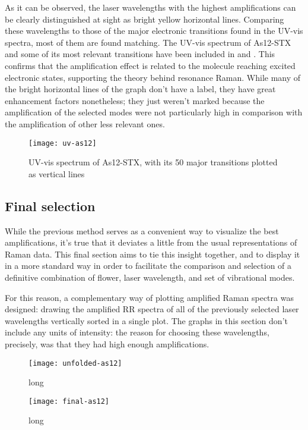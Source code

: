 As it can be observed, the laser wavelengths with the highest amplifications can be clearly distinguished at sight as bright yellow horizontal lines.
Comparing these wavelengths to those of the major electronic transitions found in the UV-vis spectra, most of them are found matching.
The UV-vis spectrum of As12-STX and some of its most relevant transitions have been included in  and .
This confirms that the amplification effect is related to the molecule reaching excited electronic states, supporting the theory behind resonance Raman.
While many of the bright horizontal lines of the graph don't have a label, they have great enhancement factors nonetheless; they just weren't marked because the amplification of the selected modes were not particularly high in comparison with the amplification of other less relevant ones.

\begin{figure}
    \texttt{[image: uv-as12]}
    \caption[UV-vis spectrum of As12-STX]{UV-vis spectrum of As12-STX, with its 50 major transitions plotted as vertical lines}
\end{figure}

\subsection{Final selection}
While the previous method serves as a convenient way to visualize the best amplifications, it's true that it deviates a little from the usual representations of Raman data.
This final section aims to tie this insight together, and to display it in a more standard way in order to facilitate the comparison and selection of a definitive combination of flower, laser wavelength, and set of vibrational modes.

For this reason, a complementary way of plotting amplified Raman spectra was designed: drawing the amplified RR spectra of all of the previously selected laser wavelengths vertically sorted in a single plot.
The graphs in this section don't include any units of intensity: the reason for choosing these wavelengths, precisely, was that they had high enough amplifications.

\begin{figure*}[h]
    \texttt{[image: unfolded-as12]}
    \caption[short]{long}
\end{figure*}

\blindtext[2]

\begin{figure}[h]
    \texttt{[image: final-as12]}
    \caption[short]{long}
\end{figure}

\blindtext[2]
